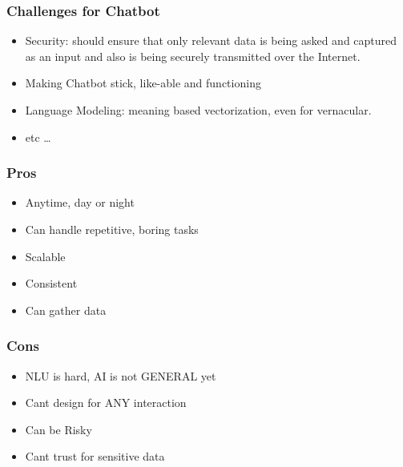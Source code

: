 \begin{frame}[fragile]\frametitle{Challenges for Chatbot}

\begin{itemize}
\item Security:  should ensure that only relevant data is being asked and captured as an input and also is being securely transmitted over the Internet.
\item Making Chatbot stick, like-able and functioning
\item Language Modeling: meaning based vectorization, even for vernacular.
\item etc \ldots
\end{itemize}
\end{frame}

\begin{frame}[fragile]\frametitle{Pros}

	\begin{itemize}
	\item  Anytime, day or night	
	\item Can handle repetitive, boring tasks
	\item Scalable
	\item Consistent
	\item Can gather data
	\end{itemize}


\end{frame}

\begin{frame}[fragile]\frametitle{Cons}

	\begin{itemize}
	\item NLU is hard, AI is not GENERAL yet
	\item Cant design for ANY interaction
	\item Can be Risky
	\item Cant trust for sensitive data
	\end{itemize}


\end{frame}
